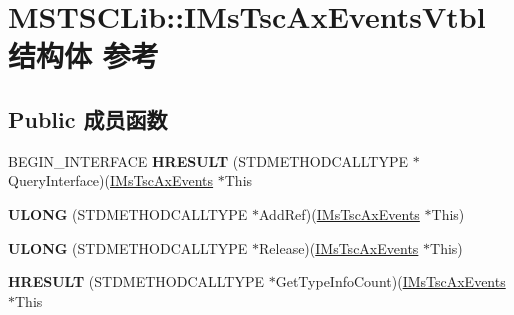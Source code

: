\hypertarget{struct_m_s_t_s_c_lib_1_1_i_ms_tsc_ax_events_vtbl}{}\section{M\+S\+T\+S\+C\+Lib\+:\+:I\+Ms\+Tsc\+Ax\+Events\+Vtbl结构体 参考}
\label{struct_m_s_t_s_c_lib_1_1_i_ms_tsc_ax_events_vtbl}
\subsection*{Public 成员函数}
\begin{DoxyCompactItemize}
\item 
\mbox{\label{struct_m_s_t_s_c_lib_1_1_i_ms_tsc_ax_events_vtbl_a8714190e83e28a8f680d21bc13319afe}} 
B\+E\+G\+I\+N\+\_\+\+I\+N\+T\+E\+R\+F\+A\+CE {\bfseries H\+R\+E\+S\+U\+LT} (S\+T\+D\+M\+E\+T\+H\+O\+D\+C\+A\+L\+L\+T\+Y\+PE $\ast$Query\+Interface)(\hyperlink{interface_m_s_t_s_c_lib_1_1_i_ms_tsc_ax_events}{I\+Ms\+Tsc\+Ax\+Events} $\ast$This
\item 
\mbox{\label{struct_m_s_t_s_c_lib_1_1_i_ms_tsc_ax_events_vtbl_a79ede78bd221d629643a4a4e2be360e9}} 
{\bfseries U\+L\+O\+NG} (S\+T\+D\+M\+E\+T\+H\+O\+D\+C\+A\+L\+L\+T\+Y\+PE $\ast$Add\+Ref)(\hyperlink{interface_m_s_t_s_c_lib_1_1_i_ms_tsc_ax_events}{I\+Ms\+Tsc\+Ax\+Events} $\ast$This)
\item 
\mbox{\label{struct_m_s_t_s_c_lib_1_1_i_ms_tsc_ax_events_vtbl_a1aa83abc27c81cba4020c9336c9a02a2}} 
{\bfseries U\+L\+O\+NG} (S\+T\+D\+M\+E\+T\+H\+O\+D\+C\+A\+L\+L\+T\+Y\+PE $\ast$Release)(\hyperlink{interface_m_s_t_s_c_lib_1_1_i_ms_tsc_ax_events}{I\+Ms\+Tsc\+Ax\+Events} $\ast$This)
\item 
\mbox{\label{struct_m_s_t_s_c_lib_1_1_i_ms_tsc_ax_events_vtbl_a40693b070e43ea1b370fc51e8ae29602}} 
{\bfseries H\+R\+E\+S\+U\+LT} (S\+T\+D\+M\+E\+T\+H\+O\+D\+C\+A\+L\+L\+T\+Y\+PE $\ast$Get\+Type\+Info\+Count)(\hyperlink{interface_m_s_t_s_c_lib_1_1_i_ms_tsc_ax_events}{I\+Ms\+Tsc\+Ax\+Events} $\ast$This
\item 
\mbox{\label{struct_m_s_t_s_c_lib_1_1_i_ms_tsc_ax_events_vtbl_a4b581f0cd6d329e6c7fc0c8051b6229c}} 

\end{DoxyCompactItemize}
